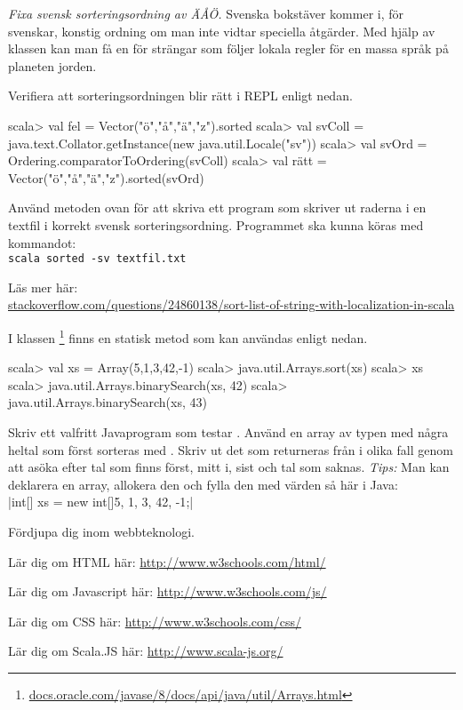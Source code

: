 \Task \label{task:swedish-letter-ordering} \emph{Fixa svensk sorteringsordning av ÄÅÖ.} Svenska bokstäver kommer i, för svenskar, konstig ordning om man inte vidtar speciella åtgärder. Med hjälp av klassen  kan man få en  för strängar som följer lokala regler för en massa språk på planeten jorden. 

\Subtask Verifiera att sorteringsordningen blir rätt i REPL enligt nedan. 

\begin{REPL}
scala> val fel = Vector("ö","å","ä","z").sorted
scala> val svColl = java.text.Collator.getInstance(new java.util.Locale("sv"))
scala> val svOrd = Ordering.comparatorToOrdering(svColl)
scala> val rätt = Vector("ö","å","ä","z").sorted(svOrd)
\end{REPL}
\Subtask Använd metoden ovan för att skriva ett program som skriver ut raderna i en textfil i korrekt svensk sorteringsordning. Programmet ska kunna köras med kommandot:\\\texttt{scala sorted -sv textfil.txt}

\Subtask Läs mer här: \\
\noindent\small{\href{http://stackoverflow.com/questions/24860138/sort-list-of-string-with-localization-in-scala}{stackoverflow.com/questions/24860138/sort-list-of-string-with-localization-in-scala}}



\Task I klassen \footnote{\href{https://docs.oracle.com/javase/8/docs/api/java/util/Arrays.html}{docs.oracle.com/javase/8/docs/api/java/util/Arrays.html}} finns en statisk metod  som kan användas enligt nedan.
\begin{REPL}
scala> val xs = Array(5,1,3,42,-1)
scala> java.util.Arrays.sort(xs)
scala> xs
scala> java.util.Arrays.binarySearch(xs, 42)
scala> java.util.Arrays.binarySearch(xs, 43)
\end{REPL}
Skriv ett valfritt Javaprogram som testar . Använd en array av typen  med några heltal som först sorteras med .  Skriv ut det som returneras från    i olika fall genom att asöka efter tal som finns först, mitt i, sist och tal som saknas. 
\emph{Tips:} Man kan deklarera en array, allokera den och fylla den med värden så här i Java: \\ 
\jcode|int[] xs = new int[]{5, 1, 3, 42, -1};|


\Task Fördjupa dig inom webbteknologi. 
    
\Subtask Lär dig om HTML här: \url{http://www.w3schools.com/html/}

\Subtask Lär dig om Javascript här: \url{http://www.w3schools.com/js/}

\Subtask Lär dig om CSS här: \url{http://www.w3schools.com/css/}

\Subtask Lär dig om Scala.JS här: \url{http://www.scala-js.org/}



    
